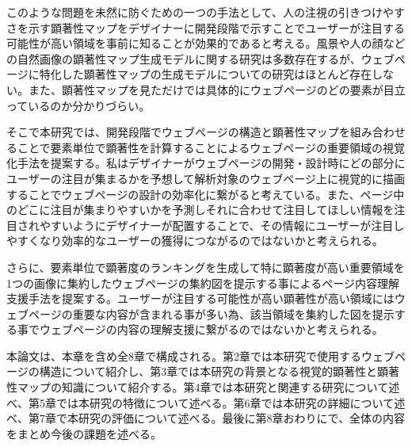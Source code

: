 \par このような問題を未然に防ぐための一つの手法として、人の注視の引きつけやすさを示す顕著性マップをデザイナーに開発段階で示すことでユーザーが注目する可能性が高い領域を事前に知ることが効果的であると考える。風景や人の顔などの自然画像の顕著性マップ生成モデルに関する研究は多数存在するが、ウェブページに特化した顕著性マップの生成モデルについての研究はほとんど存在しない。また、顕著性マップを見ただけでは具体的にウェブページのどの要素が目立っているのか分かりづらい。

\par そこで本研究では、開発段階でウェブページの構造と顕著性マップを組み合わせることで要素単位で顕著性を計算することによるウェブページの重要領域の視覚化手法を提案する。私はデザイナーがウェブページの開発・設計時にどの部分にユーザーの注目が集まるかを予想して解析対象のウェブページ上に視覚的に描画することでウェブページの設計の効率化に繋がると考えている。また、ページ中のどこに注目が集まりやすいかを予測しそれに合わせて注目してほしい情報を注目されやすいようにデザイナーが配置することで、その情報にユーザーが注目しやすくなり効率的なユーザーの獲得につながるのではないかと考えられる。
\par さらに、要素単位で顕著度のランキングを生成して特に顕著度が高い重要領域を1つの画像に集約したウェブページの集約図を提示する事によるページ内容理解支援手法を提案する。ユーザーが注目する可能性が高い顕著性が高い領域にはウェブページの重要な内容が含まれる事が多い為、該当領域を集約した図を提示する事でウェブページの内容の理解支援に繋がるのではないかと考えられる。

\par 本論文は、本章を含め全8章で構成される。第2章では本研究で使用するウェブページの構造について紹介し、第3章では本研究の背景となる視覚的顕著性と顕著性マップの知識について紹介する。第4章では本研究と関連する研究について述べ、第5章では本研究の特徴について述べる。第6章では本研究の詳細について述べ、第7章で本研究の評価について述べる。最後に第8章おわりにで、全体の内容をまとめ今後の課題を述べる。